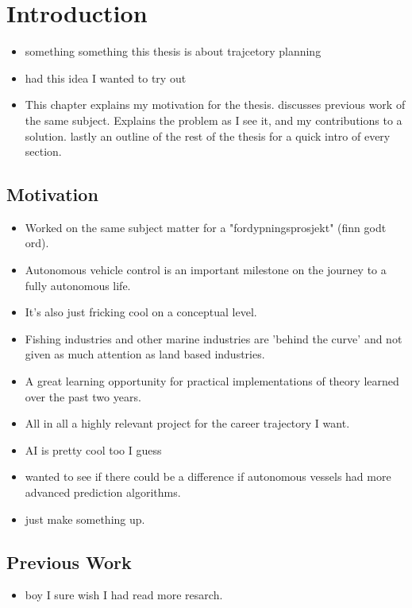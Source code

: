 \section{Introduction}
\begin{itemize}
    \item something something this thesis is about trajcetory planning
    \item had this idea I wanted to try out
    \item This chapter explains my motivation for the thesis. discusses previous work of the same subject.
    Explains the problem as I see it, and my contributions to a solution. lastly an outline of the rest of the thesis for a quick intro of every section.
\end{itemize}
\subsection{Motivation}
\begin{itemize}
    \item Worked on the same subject matter for a "fordypningsprosjekt" (finn godt ord).
    \item Autonomous vehicle control is an important milestone on the journey to a fully autonomous life.
    \item It's also just fricking cool on a conceptual level.
    \item Fishing industries and other marine industries are 'behind the curve' and not given as much attention as land based industries.
    \item A great learning opportunity for practical implementations of theory learned over the past two years.
    \item All in all a highly relevant project for the career trajectory I want.
    \item AI is pretty cool too I guess
    \item wanted to see if there could be a difference if autonomous vessels had more advanced prediction algorithms.
    \item just make something up.
\end{itemize}

\subsection{Previous Work}
\begin{itemize}
    \item boy I sure wish I had read more resarch.
\end{itemize}

